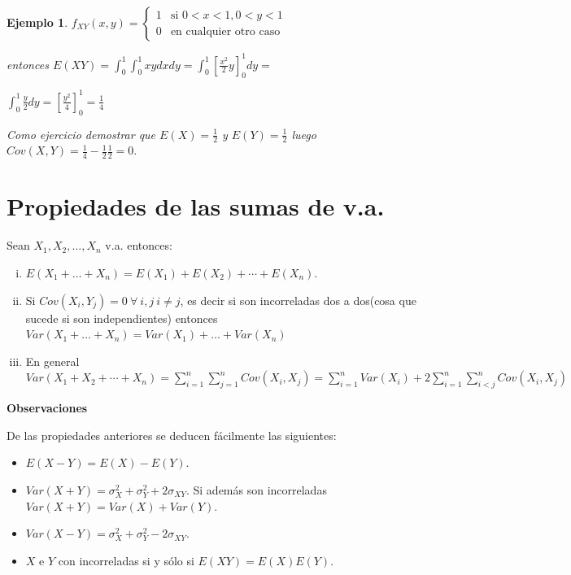 \documentclass[12pt]{report}
\newtheorem{example}[definition]{Ejemplo}
\begin{document}
     \begin{example}

    $f_{XY}(x,y)=\left\{ \begin{array}{ll}
    1 & \mbox{si } 0<x<1, 0<y<1\\
    0 & \mbox{en cualquier otro caso}
    \end{array}\right.$

    entonces $E(X Y)=\displaystyle{\int_{0}^1\int_{0}^1  x y dx dy=
    \int_{0}^1 \left[\frac{x^2}{2} y\right]_{0}^1dy=}$

    $\displaystyle{
    \int_{0}^1 \frac{y}{2} dy=\left[\frac{y^2}{4} \right]_{0}^1=
    \frac{1}{4}}$

    Como ejercicio demostrar que $E(X)=\frac{1}{2}$ y $E(Y)=\frac{1}{2}$
    luego $Cov(X,Y)=\frac{1}{4}-\frac{1}{2} \frac{1}{2}=0.$

     \end{example}

    \section{Propiedades de las sumas de v.a.}
    Sean $X_{1},X_{2},\ldots,X_{n}$ v.a.
     entonces:
    \begin{enumerate}[i)]
        \item $E(X_{1}+\ldots+X_{n})=E(X_{1})+E(X_{2})+\cdots+E(X_{n})$.
        \item  Si $Cov(X_{i},Y_{j})=0 \ \forall \ i,j \ i\not= j$, es decir si son
        incorreladas dos a dos(cosa que sucede  si son independientes)
        entonces
        $Var(X_{1}+\ldots+X_{n})=Var(X_{1})+\ldots +Var(X_{n})$

        \item En general $Var(X_1+X_2+\cdots+X_n)=\sum_{i=1}^n\sum_{j=1}^n Cov(X_i,X_j)=
\sum_{i=1}^n Var(X_i)+2\sum_{i=1}^n\sum_{i<j}^nCov(X_i,X_j)$
        \end{enumerate}


\textbf{Observaciones}

De las propiedades anteriores se deducen fácilmente las siguientes:

    \begin{itemize}
    \item $E(X-Y)=E(X)-E(Y).$

        \item 
        $Var(X+Y)=\sigma_{X}^{2}+\sigma_{Y}^{2}+2\sigma_{X Y}.$
         Si además son incorreladas $Var(X+Y)=Var(X)+Var(Y)$.
        \item
        $Var(X-Y)=\sigma_{X}^{2}+\sigma_{Y}^{2}-2\sigma_{X Y}.$
        \item $X$ e $Y$ con incorreladas si y sólo si $E(X Y)=E(X) E(Y)$.
\end{itemize}
\end{document}
